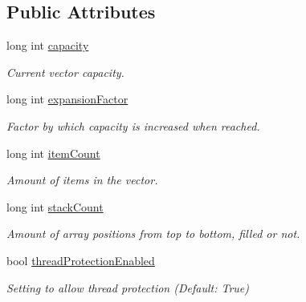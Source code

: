 \subsection*{Public Attributes}
\begin{DoxyCompactItemize}
\item 
\mbox{\label{class_c_h_i___v_e_c_t_o_r_ae73d9f91b472ae07bc32236605934ddb}} 
long int \hyperlink{class_c_h_i___v_e_c_t_o_r_ae73d9f91b472ae07bc32236605934ddb}{capacity}
\begin{DoxyCompactList}\small\item\em Current vector capacity. \end{DoxyCompactList}\item 
\mbox{\label{class_c_h_i___v_e_c_t_o_r_a587c8d362d5149da97ec6519430c4747}} 
long int \hyperlink{class_c_h_i___v_e_c_t_o_r_a587c8d362d5149da97ec6519430c4747}{expansion\+Factor}
\begin{DoxyCompactList}\small\item\em Factor by which capacity is increased when reached. \end{DoxyCompactList}\item 
\mbox{\label{class_c_h_i___v_e_c_t_o_r_a0d37a8a4650059da0888be2d9c38487a}} 
long int \hyperlink{class_c_h_i___v_e_c_t_o_r_a0d37a8a4650059da0888be2d9c38487a}{item\+Count}
\begin{DoxyCompactList}\small\item\em Amount of items in the vector. \end{DoxyCompactList}\item 
\mbox{\label{class_c_h_i___v_e_c_t_o_r_a91ef30712b0ead293dfe1adc29fee555}} 
long int \hyperlink{class_c_h_i___v_e_c_t_o_r_a91ef30712b0ead293dfe1adc29fee555}{stack\+Count}
\begin{DoxyCompactList}\small\item\em Amount of array positions from top to bottom, filled or not. \end{DoxyCompactList}\item 
\mbox{\label{class_c_h_i___v_e_c_t_o_r_a4c99e660a5201e6f11986b68ab78d468}} 
bool \hyperlink{class_c_h_i___v_e_c_t_o_r_a4c99e660a5201e6f11986b68ab78d468}{thread\+Protection\+Enabled}
\begin{DoxyCompactList}\small\item\em Setting to allow thread protection (Default\+: True) \end{DoxyCompactList}\end{DoxyCompactItemize}


